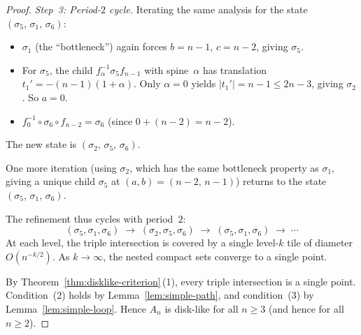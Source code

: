 \documentclass{amsart}
\theoremstyle{definition}
\theoremstyle{remark}
\begin{document}
\begin{proof}
\emph{Step~3: Period-$2$ cycle.}
Iterating the same analysis for the state
$(\sigma_5,\, \sigma_1,\, \sigma_6)$:
\begin{itemize}
\item $\sigma_1$ (the ``bottleneck'') again forces $b = n{-}1$,
  $c = n{-}2$, giving $\sigma_5$.
\item For $\sigma_5$, the child $f_\alpha^{-1} \sigma_5 f_{n-1}$
  with spine~$\alpha$ has translation
  $t_1' = -(n{-}1)(1{+}\alpha)$.  Only $\alpha = 0$ yields
  $|t_1'| = n{-}1 \le 2n{-}3$, giving $\sigma_2$.  So $a = 0$.
\item $f_0^{-1} \circ \sigma_6 \circ f_{n-2} = \sigma_6$ (since
  $0 + (n{-}2) = n{-}2$).
\end{itemize}
The new state is $(\sigma_2,\, \sigma_5,\, \sigma_6)$.

One more iteration (using $\sigma_2$, which has the same
bottleneck property as $\sigma_1$, giving a unique child $\sigma_5$
at $(a, b) = (n{-}2,\, n{-}1)$) returns to the state
$(\sigma_5,\, \sigma_1,\, \sigma_6)$.

The refinement thus cycles with period~$2$:
\[
  (\sigma_5, \sigma_1, \sigma_6)
  \;\longrightarrow\;
  (\sigma_2, \sigma_5, \sigma_6)
  \;\longrightarrow\;
  (\sigma_5, \sigma_1, \sigma_6)
  \;\longrightarrow\; \cdots
\]
At each level, the triple intersection is covered by a single
level-$k$ tile of diameter $O(n^{-k/2})$.  As $k \to \infty$,
the nested compact sets converge to a single point.

By Theorem~\ref{thm:disklike-criterion}\,(1), every triple
intersection is a single point.  Condition~(2) holds by
Lemma~\ref{lem:simple-path}, and condition~(3) by
Lemma~\ref{lem:simple-loop}.  Hence $A_n$ is disk-like for all
$n \ge 3$ (and hence for all $n \ge 2$).
\end{proof}
\end{document}
